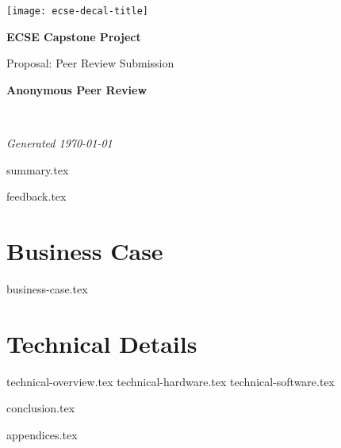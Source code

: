 \documentclass{capstone}
\begin{document}

\titlepage
	{\texttt{[image: ecse-decal-title]}}
	{
		\centering\sffamily
		{\Huge\bfseries ECSE Capstone Project\par}
		\vspace{16pt} 
		{\LARGE Proposal: Peer Review Submission\par} 
		\vspace{24pt}
		{\huge\bfseries Anonymous Peer Review \par} %
	}


~\vfill

\noindent \textit{Generated \today}

\tableofcontents


\cleardoublepage
{summary.tex}

\cleardoublepage
{feedback.tex}

\cleardoublepage

\part{Business Case}
{business-case.tex}

\part{Technical Details}
{technical-overview.tex}
{technical-hardware.tex}
{technical-software.tex}

\cleardoublepage

{conclusion.tex}

\begin{appendices}
{appendices.tex}
\end{appendices}
\end{document}
